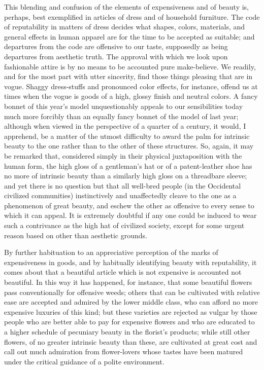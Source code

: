 \documentclass[12pt]{report}
\begin{document}
This blending and confusion of the elements of expensiveness and
of beauty is, perhaps, best exemplified in articles of dress and of
household furniture. The code of reputability in matters of dress
decides what shapes, colors, materials, and general effects in human
apparel are for the time to be accepted as suitable; and departures from
the code are offensive to our taste, supposedly as being departures from
aesthetic truth. The approval with which we look upon fashionable attire
is by no means to be accounted pure make-believe. We readily, and for
the most part with utter sincerity, find those things pleasing that
are in vogue. Shaggy dress-stuffs and pronounced color effects, for
instance, offend us at times when the vogue is goods of a high,
glossy finish and neutral colors. A fancy bonnet of this year's model
unquestionably appeals to our sensibilities today much more forcibly
than an equally fancy bonnet of the model of last year; although
when viewed in the perspective of a quarter of a century, it would, I
apprehend, be a matter of the utmost difficulty to award the palm
for intrinsic beauty to the one rather than to the other of these
structures. So, again, it may be remarked that, considered simply in
their physical juxtaposition with the human form, the high gloss of a
gentleman's hat or of a patent-leather shoe has no more of intrinsic
beauty than a similarly high gloss on a threadbare sleeve; and yet
there is no question but that all well-bred people (in the Occidental
civilized communities) instinctively and unaffectedly cleave to the one
as a phenomenon of great beauty, and eschew the other as offensive to
every sense to which it can appeal. It is extremely doubtful if any one
could be induced to wear such a contrivance as the high hat of civilized
society, except for some urgent reason based on other than aesthetic
grounds.

By further habituation to an appreciative perception of the marks
of expensiveness in goods, and by habitually identifying beauty with
reputability, it comes about that a beautiful article which is not
expensive is accounted not beautiful. In this way it has happened, for
instance, that some beautiful flowers pass conventionally for offensive
weeds; others that can be cultivated with relative ease are accepted
and admired by the lower middle class, who can afford no more expensive
luxuries of this kind; but these varieties are rejected as vulgar by
those people who are better able to pay for expensive flowers and who
are educated to a higher schedule of pecuniary beauty in the florist's
products; while still other flowers, of no greater intrinsic beauty than
these, are cultivated at great cost and call out much admiration from
flower-lovers whose tastes have been matured under the critical guidance
of a polite environment.
\end{document}
